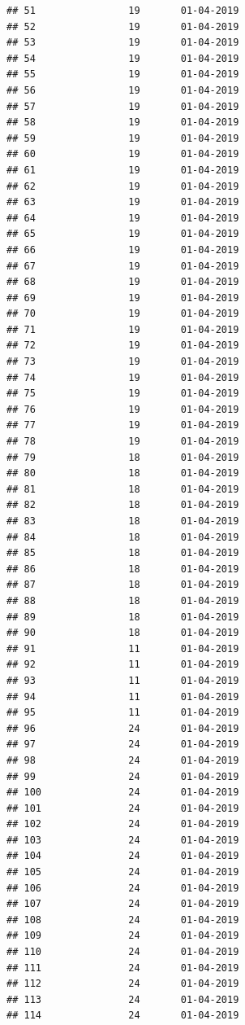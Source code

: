 \documentclass[
]{article}
\begin{document}
\begin{verbatim}
## 51                19       01-04-2019
## 52                19       01-04-2019
## 53                19       01-04-2019
## 54                19       01-04-2019
## 55                19       01-04-2019
## 56                19       01-04-2019
## 57                19       01-04-2019
## 58                19       01-04-2019
## 59                19       01-04-2019
## 60                19       01-04-2019
## 61                19       01-04-2019
## 62                19       01-04-2019
## 63                19       01-04-2019
## 64                19       01-04-2019
## 65                19       01-04-2019
## 66                19       01-04-2019
## 67                19       01-04-2019
## 68                19       01-04-2019
## 69                19       01-04-2019
## 70                19       01-04-2019
## 71                19       01-04-2019
## 72                19       01-04-2019
## 73                19       01-04-2019
## 74                19       01-04-2019
## 75                19       01-04-2019
## 76                19       01-04-2019
## 77                19       01-04-2019
## 78                19       01-04-2019
## 79                18       01-04-2019
## 80                18       01-04-2019
## 81                18       01-04-2019
## 82                18       01-04-2019
## 83                18       01-04-2019
## 84                18       01-04-2019
## 85                18       01-04-2019
## 86                18       01-04-2019
## 87                18       01-04-2019
## 88                18       01-04-2019
## 89                18       01-04-2019
## 90                18       01-04-2019
## 91                11       01-04-2019
## 92                11       01-04-2019
## 93                11       01-04-2019
## 94                11       01-04-2019
## 95                11       01-04-2019
## 96                24       01-04-2019
## 97                24       01-04-2019
## 98                24       01-04-2019
## 99                24       01-04-2019
## 100               24       01-04-2019
## 101               24       01-04-2019
## 102               24       01-04-2019
## 103               24       01-04-2019
## 104               24       01-04-2019
## 105               24       01-04-2019
## 106               24       01-04-2019
## 107               24       01-04-2019
## 108               24       01-04-2019
## 109               24       01-04-2019
## 110               24       01-04-2019
## 111               24       01-04-2019
## 112               24       01-04-2019
## 113               24       01-04-2019
## 114               24       01-04-2019

\end{verbatim}
\end{document}
